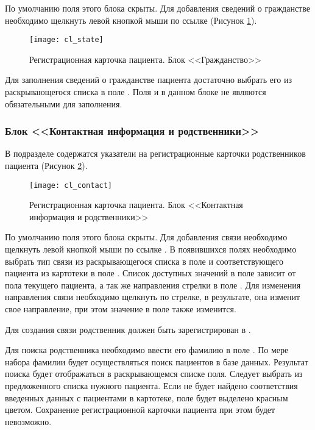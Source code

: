 {По умолчанию поля этого блока скрыты. Для добавления сведений о гражданстве необходимо щелкнуть левой кнопкой мыши по ссылке  (Рисунок \ref{img_cl_state}).

\begin{figure}[!ht]\centering
 \texttt{[image: cl\_state]}
 \caption{Регистрационная карточка пациента. Блок <<Гражданство>>}
 \label{img_cl_state}
\end{figure} 

Для заполнения сведений о гражданстве пациента достаточно выбрать его из раскрывающегося списка в поле . Поля  и  в данном блоке не являются обязательными для заполнения.
 
\subsubsection{Блок <<Контактная информация и родственники>>}

В подразделе  содержатся указатели на регистрационные карточки родственников пациента (Рисунок \ref{img_cl_contact}). 

\begin{figure}[ht!]\centering
 \texttt{[image: cl\_contact]}
 \caption{Регистрационная карточка пациента. Блок <<Контактная информация и родственники>>}
 \label{img_cl_contact}
\end{figure} 

По умолчанию поля этого блока скрыты. Для добавления связи необходимо щелкнуть левой кнопкой мыши по ссылке . В появившихся полях необходимо выбрать тип связи из раскрывающегося списка в поле  и соответствующего пациента из картотеки в поле . Список доступных значений в поле  зависит от пола текущего пациента, а так же направления стрелки в поле . Для изменения направления связи необходимо щелкнуть по стрелке, в результате, она изменит свое направление, при этом значение в поле  также изменится. 

\begin{vnim}
Для создания связи родственник должен быть зарегистрирован в \tmis.
\end{vnim}

Для поиска родственника необходимо ввести его фамилию в поле . По мере набора фамилии будет осуществляться поиск пациентов в базе данных. Результат поиска будет отображаться в раскрывающемся списке поля. Следует выбрать из предложенного списка нужного пациента. Если не будет найдено соответствия введенных данных с пациентами в картотеке, поле  будет выделено красным цветом. Сохранение регистрационной карточки пациента при этом будет невозможно. 

}
